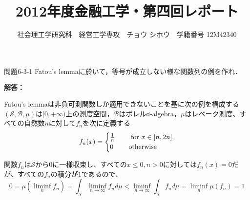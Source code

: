 \documentclass{jsarticle}
\begin{document}
\title{2012年度金融工学・第四回レポート}
\author{{\normalsize 社会理工学研究科　経営工学専攻　チョウ シホウ　学籍番号 12M42340}}
\date{}
\maketitle

\def \Pr{{\rm Pr}}


\baselineskip 0.6cm

\begin{itembox}[l]{問題6-3-1}
Fatou's lemmaに於いて，等号が成立しない様な関数列の例を作れ．
\end{itembox}
{\bf 解答：}

Fatou's lemmaは非負可測関数しか適用できないことを基に次の例を構成する\\
$(\mathcal{S},\mathcal{B},\mu)$は$[0,+\infty)$上の測度空間，$\mathcal{B}$はボレルσ-algebra，$\mu$はレベーク測度、すべての自然数$n$に対して$f_n$を次に定義する
\[
f_n(x) = \begin{cases}
\frac{1}{n} & \text{\,\,\,\,\,\, for $x \in [n,2n]$}, \\
0 & \text{\,\,\,\,\,\,otherwise}
\end{cases}
\]

関数$f_n$は$\mathcal{S}$から$0$に一様収束し、すべての$x \le 0,n > 0$に対しては$f_n(x)=0$だが、すべての$f_n$の積分が$1$であるので、
\[
0 = \mu(\liminf_n f_n) = \int_{\mathcal{S}} \liminf_{n \to \infty} f_n d\mu < \liminf_{n \to \infty} \int_{\mathcal{S}} f_n d\mu =  \liminf_n \mu(f_n)  = 1
\]
\end{document}
